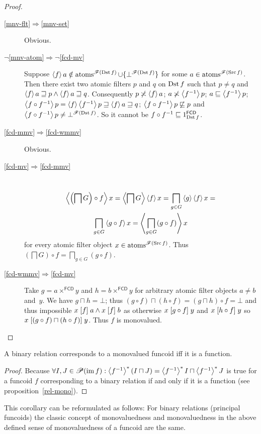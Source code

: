 \begin{proof}
\begin{description}
\item [{\ref{mnv-flt}$\Rightarrow$\ref{mnv-set}}] Obvious.
\item [{$\lnot$\ref{mnv-atom}$\Rightarrow$$\lnot$\ref{fcd-mv}}] Suppose
$\left\langle f\right\rangle a\notin\operatorname{atoms}^{\mathscr{F}(\operatorname{Dst} f)}\cup\{\bot^{\mathscr{F}(\operatorname{Dst} f)}\}$
for some $a\in\operatorname{atoms}^{\mathscr{F}(\operatorname{Src} f)}$. Then there exist two
atomic filters $p$ and $q$ on $\operatorname{Dst} f$ such that $p\ne q$ and
$\left\langle f\right\rangle a\sqsupseteq p\land\left\langle f\right\rangle a\sqsupseteq q$. Consequently
$p\not\asymp\left\langle f\right\rangle a$; $a\not\asymp\left\langle f^{-1}\right\rangle p$;
$a\sqsubseteq\left\langle f^{-1}\right\rangle p$;
$\left\langle f\circ f^{-1}\right\rangle p=\left\langle f\right\rangle\left\langle f^{-1}\right\rangle p\sqsupseteq\left\langle f\right\rangle a\sqsupseteq q$;
$\left\langle f\circ f^{-1}\right\rangle p\not\sqsubseteq p$ and $\left\langle f\circ
f^{-1}\right\rangle p\ne\bot^{\mathscr{F}(\operatorname{Dst} f)}$.
So it cannot be $f\circ f^{-1}\sqsubseteq1_{\operatorname{Dst} f}^{\mathsf{FCD}}$.
\item [{\ref{fcd-mmv}$\Rightarrow$\ref{fcd-wmmv}}] Obvious.
\item [{\ref{fcd-mv}$\Rightarrow$\ref{fcd-mmv}}] ~
\begin{multline*}
\left\langle \left(\bigsqcap G\right)\circ f\right\rangle x=\left\langle \bigsqcap
G\right\rangle\left\langle f\right\rangle x=\bigsqcap_{g\in G}\left\langle g\right\rangle\left\langle f\right\rangle x=\\\bigsqcap_{g\in
G}\left\langle g\circ f\right\rangle x=\left\langle \bigsqcap_{g\in G}(g\circ f)\right\rangle x
\end{multline*}
for every atomic filter object $x\in\operatorname{atoms}^{\mathscr{F}(\operatorname{Src} f)}$.
Thus $\left(\bigsqcap G\right)\circ f=\bigsqcap_{g\in G}(g\circ f)$.
\item [{\ref{fcd-wmmv}$\Rightarrow$\ref{fcd-mv}}] Take
$g=a\times^{\mathsf{FCD}}y$
and $h=b\times^{\mathsf{FCD}}y$ for arbitrary atomic filter objects
$a\ne b$ and~$y$. We have $g\sqcap h=\bot$; thus $(g\circ f)\sqcap(h\circ
f)=(g\sqcap h)\circ f=\bot$
and thus impossible $x\mathrel{\left[f\right]}a\land x\mathrel{\left[f\right]}b$ as otherwise $x\mathrel{\left[g\circ
f\right]}y$
and $x\mathrel{\left[h\circ f\right]}y$ so $x\mathrel{\left[(g\circ f)\sqcap(h\circ f)\right]}y$.
Thus $f$ is monovalued.
\end{description}
\end{proof}
\begin{cor}
A binary relation corresponds to a monovalued funcoid iff it is a
function.\end{cor}
\begin{proof}
Because $\forall I,J\in\mathscr{P}(\operatorname{im} f):\left\langle f^{-1}\right\rangle ^{\ast}(I\sqcap
J)=\left\langle f^{-1}\right\rangle ^{\ast}I\sqcap\left\langle f^{-1}\right\rangle ^{\ast}J$
is true for a funcoid $f$ corresponding to a binary relation if and
only if it is a function (see proposition~\ref{rel-mono}).\end{proof}
\begin{rem}
This corollary can be reformulated as follows: For binary relations
(principal funcoids) the classic concept of monovaluedness and monovaluedness
in the above defined sense of monovaluedness of a funcoid are the
same.\end{rem}
